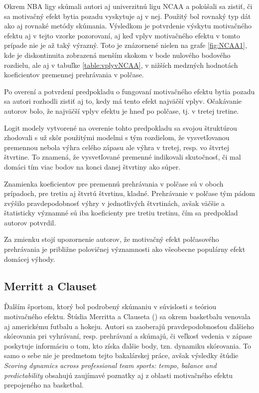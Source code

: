 \documentclass[
  digital, %
  twoside, %
  notable,   %
  lof,     %
  lot,     %
]{fithesis3}
\begin{document}
		Okrem NBA ligy skúmali autori aj univerzitnú ligu NCAA a pokúšali sa zistiť, či sa motivačný efekt bytia pozadu vyskytuje aj v nej. Použitý bol rovnaký typ dát ako aj rovnaké metódy skúmania. Výsledkom je potvrdenie výskytu motivačného efektu aj v tejto vzorke pozorovaní, aj keď vplyv motivačného efektu v tomto prípade nie je až taký výrazný. Toto je znázornené nielen na grafe \ref{fig:NCAA1}, kde je diskontinuita zobrazená menším skokom v bode nulového bodového rozdielu, ale aj v tabuľke \ref{table:vplyvNCAA}, v nižších medzných hodnotách koeficientov premennej prehrávania v polčase.
		
		Po overení a potvrdení predpokladu o fungovaní motivačného efektu bytia pozadu sa autori rozhodli zistiť aj to, kedy má tento efekt najväčší vplyv. Očakávanie autorov bolo, že najväčší vplyv efektu je hneď po polčase, tj. v tretej tretine.
		
		Logit modely vytvorené na overenie tohto predpokladu sa svojou štruktúrou zhodovali s už skôr použitými modelmi s tým rozdielom, že vysvetľovanou premennou nebola výhra celého zápasu ale výhra v tretej, resp. vo štvrtej štvrtine. To znamená, že vysvetľované premenné indikovali skutočnosť, či mal domáci tím viac bodov na konci danej štvrtiny ako súper. 
		
		Znamienka koeficientov pre premennú prehrávania v polčase sú v oboch prípadoch, pre tretiu aj štvrtú štvrtinu, kladné. Prehrávanie v polčase tým pádom zvýšilo pravdepodobnosť výhry v jednotlivých štvrtinách, avšak väčšie a štatisticky významné sú iba koeficienty pre tretiu tretinu, čím sa predpoklad autorov potvrdil. \parencite[s.~822]{berger2011}		
			
		Za zmienku stojí upozornenie autorov, že motivačný efekt polčasového prehrávania je približne polovičnej významnosti ako všeobecne populárny efekt domácej výhody.

		\subsection{Merritt a Clauset}
		Ďalším športom, ktorý bol podrobený skúmaniu v súvislosti s teóriou motivačného efektu. Štúdia Merritta a Clauseta (\citeyear{merritt2014}) sa okrem basketbalu venovala aj americkému futbalu a hokeju. Autori sa zaoberajú pravdepodobnosťou ďalšieho skórovania pri vyhrávaní, resp. prehrávaní a skúmajú, či veľkosť vedenia v zápase poskytuje informáciu o tom, kto získa ďalšie body, tzn. dynamiku skórovania. To samo o sebe nie je predmetom tejto bakalárskej práce, avšak výsledky štúdie \textit{Scoring dynamics across professional team sports: tempo, balance and predictability} obsahujú zaujímavé poznatky aj z oblasti motivačného efektu prepojeného na basketbal.
		
\end{document}
